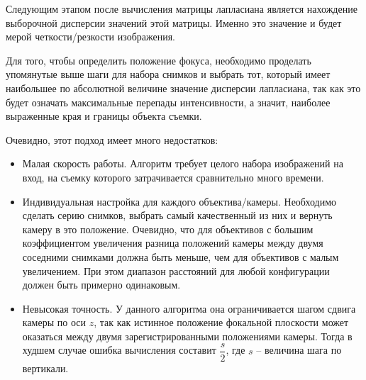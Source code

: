 Следующим этапом после вычисления матрицы лапласиана является нахождение выборочной дисперсии значений этой матрицы. Именно это значение и будет мерой четкости/резкости изображения.

Для того, чтобы определить положение фокуса, необходимо проделать упомянутые выше шаги для набора снимков и выбрать тот, который имеет наибольшее по абсолютной величине значение дисперсии лапласиана, так как это будет означать максимальные перепады интенсивности, а значит, наиболее выраженные края и границы объекта съемки.

Очевидно, этот подход имеет много недостатков:
\begin{itemize}
	\item Малая скорость работы. Алгоритм требует целого набора изображений на вход, на съемку которого затрачивается сравнительно много времени.
	\item Индивидуальная настройка для каждого объектива/камеры. Необходимо сделать серию снимков, выбрать самый качественный из них и вернуть камеру в это положение. Очевидно, что для объективов с большим коэффициентом увеличения разница положений камеры между двумя соседними снимками должна быть меньше, чем для объективов с малым увеличением. При этом диапазон расстояний для любой конфигурации должен быть примерно одинаковым.
	\item Невысокая точность. У данного алгоритма она ограничивается шагом сдвига камеры по оси $z$, так как истинное положение фокальной плоскости может оказаться между двумя зарегистрированными положениями камеры. Тогда в худшем случае ошибка вычисления составит $\dfrac{s}{2}$, где $s$ -- величина шага по вертикали.
\end{itemize}


